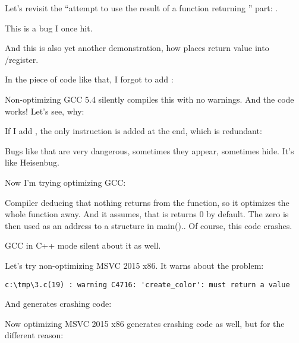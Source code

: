 \label{ForgottenReturn}

Let's revisit the ``attempt to use the result of a function returning \Tvoid'' part: .

This is a bug I once hit.

And this is also yet another demonstration, how \CCpp{} places return value into \EAX/\RAX register.

In the piece of code like that, I forgot to add :



Non-optimizing GCC 5.4 silently compiles this with no warnings.
And the code works!
Let's see, why:



If I add , the only instruction is added at the end, which is redundant:



Bugs like that are very dangerous, sometimes they appear, sometimes hide.
It's like Heisenbug.

Now I'm trying optimizing GCC:



Compiler deducing that nothing returns from the function, so it optimizes the whole function away.
And it assumes, that is returns 0 by default. The zero is then used as an address to a structure in main()..
Of course, this code crashes.

GCC in C++ mode silent about it as well.

Let's try non-optimizing MSVC 2015 x86.
It warns about the problem:

\begin{lstlisting}
c:\tmp\3.c(19) : warning C4716: 'create_color': must return a value                                                               
\end{lstlisting}

And generates crashing code:



Now optimizing MSVC 2015 x86 generates crashing code as well, but for the different reason:

